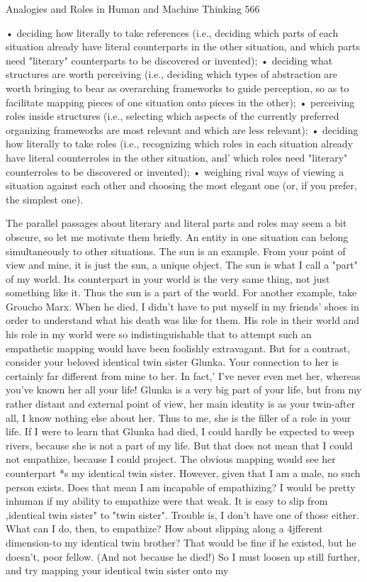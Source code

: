 Analogies and Roles in Human and Machine Thinking                                      566

• deciding how literally to take references (i.e., deciding which parts of each situation
  already have literal counterparts in the other situation, and which parts need
  "literary" counterparts to be discovered or invented);
• deciding what structures are worth perceiving (i.e., deciding which types of
  abstraction are worth bringing to bear as overarching frameworks to guide
  perception, so as to facilitate mapping pieces of one situation onto pieces in the
  other);
• perceiving roles inside structures (i.e., selecting which aspects of the currently
  preferred organizing frameworks are most relevant and which are less relevant);
• deciding how literally to take roles (i.e., recognizing which roles in each situation
  already have literal counterroles in the other situation, and' which roles need
  "literary" counterroles to be discovered or invented);
• weighing rival ways of viewing a situation against each other and choosing the
  most elegant one (or, if you prefer, the simplest one).

The parallel passages about literary and literal parts and roles may seem a bit obscure,
so let me motivate them briefly.
        An entity in one situation can belong simultaneously to other situations. The
sun is an example. From your point of view and mine, it is just the sun, a unique
object. The sun is what I call a "part" of my world. Its counterpart in your world is the
very same thing, not just something like it. Thus the sun is a part of the world. For
another example, take Groucho Marx. When he died, I didn't have to put myself in my
friends' shoes in order to understand what his death was like for them. His role in their
world and his role in my world were so indistinguishable that to attempt such an
empathetic mapping would have been foolishly extravagant.
        But for a contrast, consider your beloved identical twin sister Glunka. Your
connection to her is certainly far different from mine to her. In fact,' I've never even
met her, whereas you've known her all your life! Glunka is a very big part of your life,
but from my rather distant and external point of view, her main identity is as your
twin-after all, I know nothing else about her. Thus to me, she is the filler of a role in
your life. If I were to learn that Glunka had died, I could hardly be expected to weep
rivers, because she is not a part of my life. But that does not mean that I could not
empathize, because I could project. The obvious mapping would see her counterpart
*s my identical twin sister. However, given that I am a male, no such person exists.
Does that mean I am incapable of empathizing? I would be pretty inhuman if my
ability to empathize were that weak. It is easy to slip from ,identical twin sister" to
"twin sister". Trouble is, I don't have one of those either. What can I do, then, to
empathize? How about slipping along a 4jfferent dimension-to my identical twin
brother? That would be fine if he existed, but he doesn't, poor fellow. (And not
because he died!) So I must loosen up still further, and try mapping your identical
twin sister onto my




